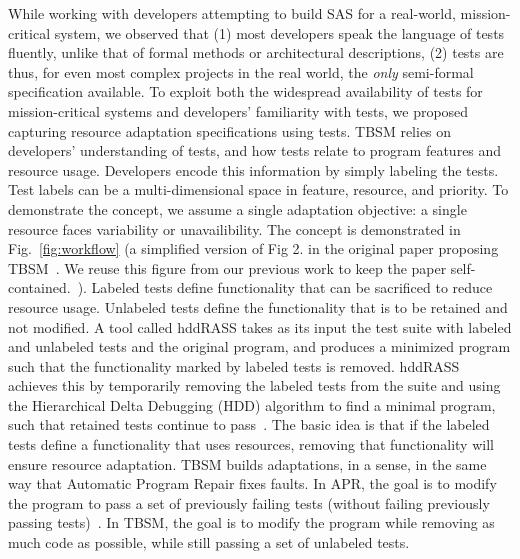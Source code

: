 While working with developers attempting to build SAS for a real-world, mission-critical system, we observed that (1) most developers speak the language of tests fluently, unlike that of formal methods or architectural descriptions,  (2) tests are thus, for even most complex projects in the real world, the \emph{only} semi-formal specification available. To exploit both the widespread availability of tests for mission-critical systems and developers' familiarity with tests, we proposed capturing resource adaptation specifications using tests.
TBSM relies on developers' understanding of tests, and how tests relate to program features and resource usage. Developers encode this information by simply labeling the tests. Test labels can be a multi-dimensional space in feature, resource, and priority. To demonstrate the concept, we assume a single adaptation objective: a single resource faces variability or unavailibility. The concept is demonstrated in Fig.~\ref{fig:workflow} (a simplified version of Fig 2. in the original paper proposing TBSM~\cite{christi2017saso}. We reuse this figure from our previous work to keep the paper self-contained.~\cite{christi2019qrs}). Labeled tests define functionality that can be sacrificed to reduce resource usage. Unlabeled tests define the functionality that is to be retained and not modified. A tool called hddRASS takes as its input the test suite with labeled and unlabeled tests and the original program, and produces a minimized program such that the functionality marked by labeled tests is removed. hddRASS achieves this by temporarily removing the labeled tests from the suite and using the Hierarchical Delta Debugging (HDD) algorithm to find a minimal program, such that retained tests continue to pass~\cite{misherghi2006hdd}. The basic idea is that if the labeled tests define a functionality that uses resources, removing that functionality will ensure resource adaptation. TBSM builds adaptations, in a sense, in the same way that Automatic Program Repair fixes faults. In APR, the goal is to modify the program to pass a set of previously failing tests (without failing previously passing tests)~\cite{monperrus2018asr}. In TBSM, the goal is to modify the program while removing as much code as possible, while still passing a set of unlabeled tests.

